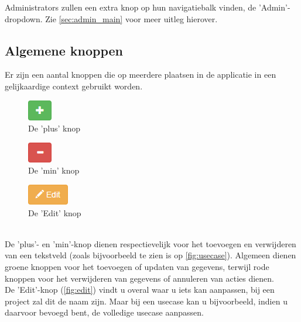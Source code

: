 \documentclass[a4paper,11pt]{article}
\begin{document}
Administrators zullen een extra knop op hun navigatiebalk vinden, de 'Admin'-dropdown. Zie \autoref{sec:admin_main} voor meer uitleg hierover.

\subsection{Algemene knoppen}
Er zijn een aantal knoppen die op meerdere plaatsen in de applicatie in een gelijkaardige context gebruikt worden.\\
\begin{minipage}{0.32\textwidth}
\begin{figure}[H]
\centering
\includegraphics[scale=0.5]{Gebruikershandleiding_img/plus.png}
\caption{De 'plus' knop}
\label{fig:plus}
\end{figure}
\end{minipage}
\begin{minipage}{0.35\textwidth}
\begin{figure}[H]
\centering
\includegraphics[scale=0.5]{Gebruikershandleiding_img/min.png}
\caption{De 'min' knop}
\label{fig:min}
\end{figure}
\end{minipage}
\begin{minipage}{0.32\textwidth}
\begin{figure}[H]
\centering
\includegraphics[scale=0.5]{Gebruikershandleiding_img/edit.png}
\caption{De 'Edit' knop}
\label{fig:edit}
\end{figure}
\end{minipage}\\

De 'plus'- en 'min'-knop dienen respectievelijk voor het toevoegen en verwijderen van een tekstveld (zoals bijvoorbeeld te zien is op \autoref{fig:usecase}). Algemeen dienen groene knoppen voor het toevoegen of updaten van gegevens, terwijl rode knoppen voor het verwijderen van gegevens of annuleren van acties dienen.\\
De 'Edit'-knop (\autoref{fig:edit}) vindt u overal waar u iets kan aanpassen, bij een project zal dit de naam zijn. Maar bij een usecase kan u bijvoorbeeld, indien u daarvoor bevoegd bent, de volledige usecase aanpassen.
\end{document}
